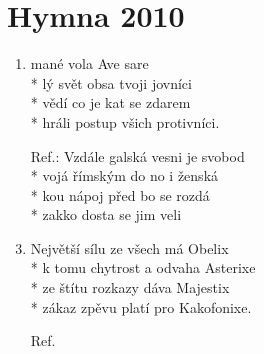 \section{Hymna 2010}
\begin{enumerate}
\item {}mané vola Ave sare \\*
lý svět obsa tvoji jovníci\\*
vědí co je kat se zdarem \\*
hráli postup všich protivníci. 
\item[Ref.:] Vzdále galská  vesni je svobod \\*
vojá římským  do no i ženská \\*
kou nápoj  před bo se rozdá\\*
zakko dosta se jim  veli
\item Největší sílu ze všech má Obelix \\*
k tomu chytrost a odvaha Asterixe\\*
ze štítu rozkazy dáva Majestix\\*
zákaz zpěvu platí pro Kakofonixe. 
\item[Ref.]
\end{enumerate}
